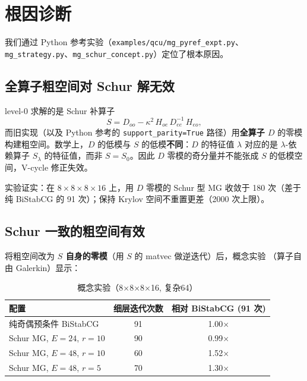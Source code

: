 \documentclass[11pt,a4paper]{article}
\begin{document}
\section{根因诊断}
\label{sec:rootcause}

我们通过 Python 参考实验（\texttt{examples/qcu/mg\_pyref\_expt.py}、
\texttt{mg\_strategy.py}、\texttt{mg\_schur\_concept.py}）定位了根本原因。

\subsection{全算子粗空间对 Schur 解无效}
\label{sec:schur-lowmodes}

level-0 求解的是 Schur 补算子
\begin{equation}
  S = D_{oo} - \kappa^2\,H_{oe}\,D_{ee}^{-1}\,H_{eo},
\end{equation}
而旧实现（以及 Python 参考的 \texttt{support\_parity=True} 路径）用\textbf{全算子
$D$} 的零模构建粗空间。数学上，$D$ 的低模与 $S$ 的低模\textbf{不同}：$D$ 的特征值
$\lambda$ 对应的是 $\lambda$-依赖算子 $S_\lambda$ 的特征值，而非 $S=S_0$。因此
$D$ 零模的奇分量并不能张成 $S$ 的低模空间，V-cycle 修正失效。

实验证实：在 $8\times8\times8\times16$ 上，用 $D$ 零模的 Schur 型 MG 收敛于
180 次（差于纯 BiStabCG 的 91 次）；保持 Krylov 空间不重置更差（2000 次上限）。

\subsection{Schur 一致的粗空间有效}
\label{sec:schur-consistent}

将粗空间改为 \textbf{$S$ 自身的零模}（用 $S$ 的 matvec 做逆迭代）后，概念实验
（算子自由 Galerkin）显示：
\begin{table}[h]
\centering
\begin{tabular}{lcc}
\toprule
配置 & 细层迭代次数 & 相对 BiStabCG (91 次) \\
\midrule
纯奇偶预条件 BiStabCG & 91 & 1.00$\times$ \\
Schur MG, $E=24$, $r=10$ & 90 & 0.99$\times$ \\
Schur MG, $E=48$, $r=10$ & 60 & 1.52$\times$ \\
Schur MG, $E=48$, $r=5$ & 70 & 1.30$\times$ \\
\bottomrule
\end{tabular}
\caption{概念实验（8$\times$8$\times$8$\times$16, 复杂64）}
\end{table}
\end{document}
